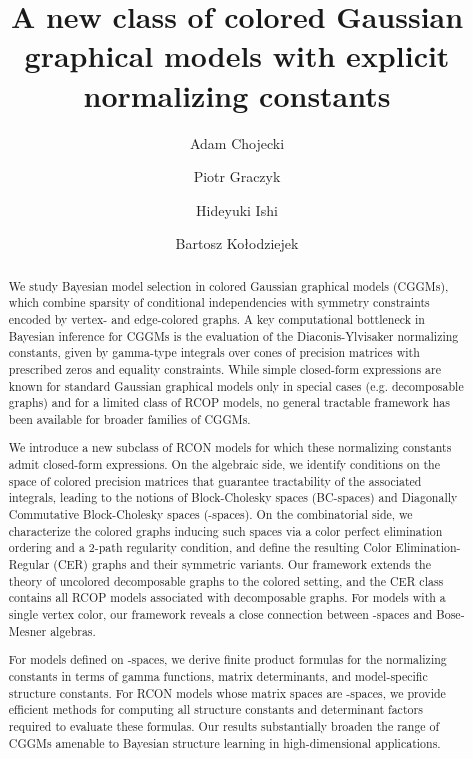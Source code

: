 \documentclass[12pt]{amsart}
\title[A new class of colored Gaussian graphical models]
{A new class of colored Gaussian graphical models
with explicit normalizing constants}
\author[A. Chojecki]{Adam Chojecki}
\author[P. Graczyk]{Piotr Graczyk}
\author[H. Ishi]{Hideyuki Ishi}
\author[B. Ko{\l}odziejek]{Bartosz Ko{\l}odziejek}
\date{}
\theoremstyle{plain}
\theoremstyle{definition}
\theoremstyle{remark}
\newcommand{\1}{\mathbf{1}}
\begin{document}
\begin{abstract}
We study Bayesian model selection in colored Gaussian graphical models (CGGMs), which combine sparsity of conditional independencies with symmetry constraints encoded by vertex- and edge-colored graphs. A key computational bottleneck in Bayesian inference for CGGMs is the evaluation of the Diaconis-Ylvisaker normalizing constants, given by gamma-type integrals over cones of precision matrices with prescribed zeros and equality constraints. While simple closed-form expressions are known for standard Gaussian graphical models only in special cases (e.g. decomposable graphs) and for a limited class of RCOP models, no general tractable framework has been available for broader families of CGGMs.

We introduce a new subclass of RCON models for which these normalizing constants admit closed-form expressions. On the algebraic side, we identify conditions on the space of colored precision matrices that guarantee tractability of the associated integrals, leading to the notions of Block-Cholesky spaces (BC-spaces) and Diagonally Commutative Block-Cholesky spaces (\cBC-spaces). On the combinatorial side, we characterize the colored graphs inducing such spaces via a color perfect elimination ordering and a $2$-path regularity condition, and define the resulting Color Elimination-Regular (CER) graphs and their symmetric variants. Our framework extends the theory of uncolored decomposable graphs to the colored setting, and the CER class contains all RCOP models associated with decomposable graphs.
For models with a single vertex color, our framework reveals a close connection between \cBC-spaces and Bose-Mesner algebras.

For models defined on \BC-spaces, we derive finite product formulas for the normalizing constants in terms of gamma functions, matrix determinants, and model-specific structure constants. For RCON models whose matrix spaces are \cBC-spaces, we provide efficient methods for computing all structure constants and determinant factors required to evaluate these formulas. Our results substantially broaden the range of CGGMs amenable to Bayesian structure learning in high-dimensional applications.
\end{abstract}

\maketitle
\tableofcontents
\end{document}
